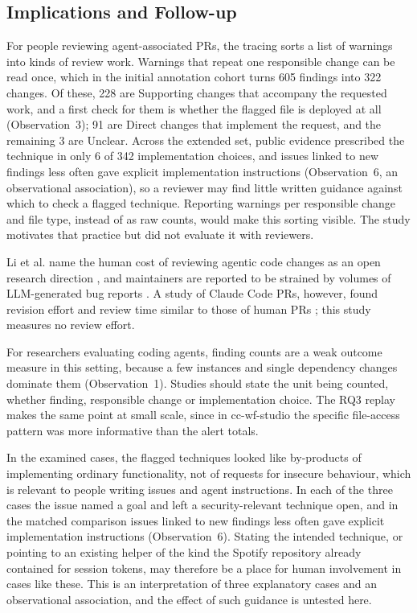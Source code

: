 \documentclass[acmsmall,screen,nonacm,review]{acmart}
\begin{document}
\subsection{Implications and Follow-up}

For people reviewing agent-associated PRs, the tracing sorts a list of warnings into kinds of review work. Warnings that repeat one responsible change can be read once, which in the initial annotation cohort turns 605 findings into 322 changes. Of these, 228 are Supporting changes that accompany the requested work, and a first check for them is whether the flagged file is deployed at all (Observation~3); 91 are Direct changes that implement the request, and the remaining 3 are Unclear. Across the extended set, public evidence prescribed the technique in only 6 of 342 implementation choices, and issues linked to new findings less often gave explicit implementation instructions (Observation~6, an observational association), so a reviewer may find little written guidance against which to check a flagged technique. Reporting warnings per responsible change and file type, instead of as raw counts, would make this sorting visible. The study motivates that practice but did not evaluate it with reviewers.

Li et al. name the human cost of reviewing agentic code changes as an open research direction \cite{b11}, and maintainers are reported to be strained by volumes of LLM-generated bug reports \cite{b16}. A study of Claude Code PRs, however, found revision effort and review time similar to those of human PRs \cite{b21}; this study measures no review effort.

For researchers evaluating coding agents, finding counts are a weak outcome measure in this setting, because a few instances and single dependency changes dominate them (Observation~1). Studies should state the unit being counted, whether finding, responsible change or implementation choice. The RQ3 replay makes the same point at small scale, since in cc-wf-studio the specific file-access pattern was more informative than the alert totals.

In the examined cases, the flagged techniques looked like by-products of implementing ordinary functionality, not of requests for insecure behaviour, which is relevant to people writing issues and agent instructions. In each of the three cases the issue named a goal and left a security-relevant technique open, and in the matched comparison issues linked to new findings less often gave explicit implementation instructions (Observation~6). Stating the intended technique, or pointing to an existing helper of the kind the Spotify repository already contained for session tokens, may therefore be a place for human involvement in cases like these. This is an interpretation of three explanatory cases and an observational association, and the effect of such guidance is untested here.
\end{document}

